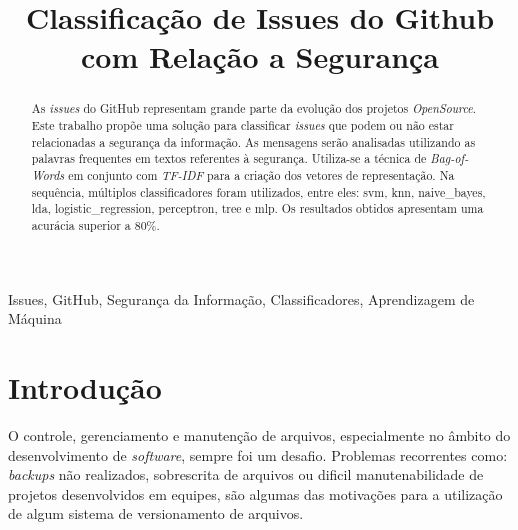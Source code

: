 \documentclass[conference]{IEEEtran}
\begin{document}
\title{Classificação de Issues do Github com Relação a Segurança}

\author{
    \and
}

\maketitle

\begin{abstract}
    As \textit{issues} do GitHub representam grande parte da evolução dos projetos \textit{OpenSource}. Este trabalho propõe uma solução para classificar \textit{issues} que podem ou não estar relacionadas a segurança da informação. As mensagens serão analisadas utilizando as palavras frequentes em textos referentes à segurança. Utiliza-se a técnica de \textit{Bag-of-Words} em conjunto com \textit{TF-IDF} para a criação dos vetores de representação. Na sequência, múltiplos classificadores foram utilizados, entre eles: svm, knn, naive\_bayes, lda, logistic\_regression, perceptron, tree e mlp. Os resultados obtidos apresentam uma acurácia superior a 80\%.
\end{abstract}

\begin{IEEEkeywords}
    Issues, GitHub, Segurança da Informação, Classificadores, Aprendizagem de Máquina
\end{IEEEkeywords}

\section{Introdução}

O controle, gerenciamento e manutenção de arquivos, especialmente no âmbito do desenvolvimento de \textit{software}, sempre foi um desafio. Problemas recorrentes como: \textit{backups} não realizados, sobrescrita de arquivos ou dificil manutenabilidade de projetos desenvolvidos em equipes, são algumas das motivações para a utilização de algum sistema de versionamento de arquivos. \cite{Scott:ProGit}
\end{document}
